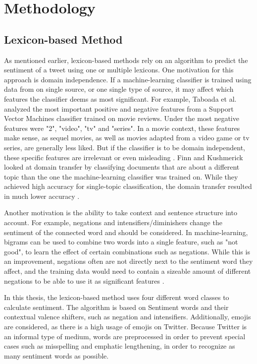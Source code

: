 \chapter{Methodology}
\label{cha:Chapter4_Methodology}

\section{Lexicon-based Method}
As mentioned earlier, lexicon-based methods rely on an algorithm to predict the sentiment of a tweet using one or multiple lexicons. One motivation for this approach is domain independence. If a machine-learning classifier is trained using data from on single source, or one single type of source, it may affect which features the classifier deems as most significant. For example, Taboada et al. analyzed the most important positive and negative features from a Support Vector Machines classifier trained on movie reviews. Under the most negative features were "2", "video", "tv" and "series". In a movie context, these features make sense, as sequel movies, as well as movies adapted from a video game or tv series, are generally less liked. But if the classifier is to be domain independent, these specific features are irrelevant or even misleading \cite{taboada}. Finn and Kushmerick looked at domain transfer by classifying documents that are about a different topic than the one the machine-learning classifier was trained on. While they achieved high accuracy for single-topic classification, the domain transfer resulted in much lower accuracy \cite{Finn03learningto}.

Another motivation is the ability to take context and sentence structure into account. For example, negations and intensifiers/diminishers change the sentiment of the connected word and should be considered. In machine-learning, bigrams can be used to combine two words into a single feature, such as "not good", to learn the effect of certain combinations such as negations. While this is an improvement, negations often are not directly next to the sentiment word they affect, and the training data would need to contain a sizeable amount of different negations to be able to use it as significant features \cite{taboada}.

In this thesis, the lexicon-based method uses four different word classes to calculate sentiment. The algorithm is based on Sentiment words and their contextual valence shifters, such as negation and intensifiers. Additionally, emojis are considered, as there is a high usage of emojis on Twitter. Because Twitter is an informal type of medium, words are preprocessed in order to prevent special cases such as misspelling and emphatic lengthening, in order to recognize as many sentiment words as possible.

